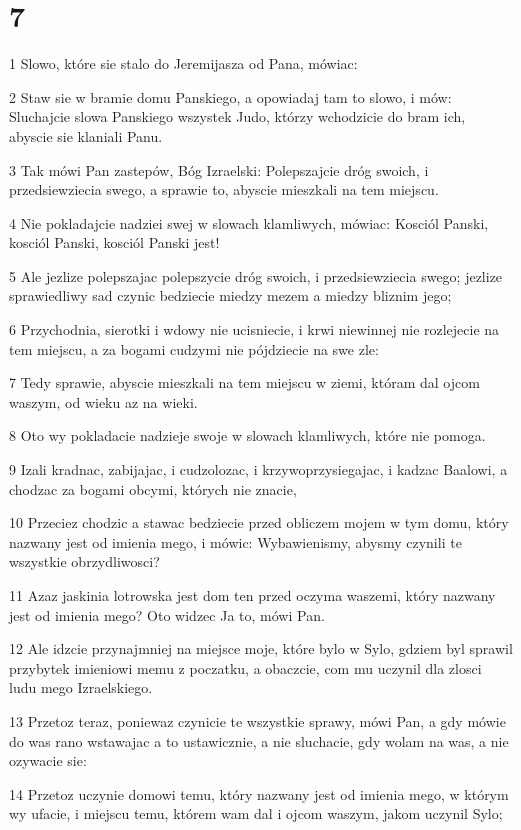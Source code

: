 \chapter{7}

\par 1 Slowo, które sie stalo do Jeremijasza od Pana, mówiac:
\par 2 Staw sie w bramie domu Panskiego, a opowiadaj tam to slowo, i mów: Sluchajcie slowa Panskiego wszystek Judo, którzy wchodzicie do bram ich, abyscie sie klaniali Panu.
\par 3 Tak mówi Pan zastepów, Bóg Izraelski: Polepszajcie dróg swoich, i przedsiewziecia swego, a sprawie to, abyscie mieszkali na tem miejscu.
\par 4 Nie pokladajcie nadziei swej w slowach klamliwych, mówiac: Kosciól Panski, kosciól Panski, kosciól Panski jest!
\par 5 Ale jezlize polepszajac polepszycie dróg swoich, i przedsiewziecia swego; jezlize sprawiedliwy sad czynic bedziecie miedzy mezem a miedzy bliznim jego;
\par 6 Przychodnia, sierotki i wdowy nie ucisniecie, i krwi niewinnej nie rozlejecie na tem miejscu, a za bogami cudzymi nie pójdziecie na swe zle:
\par 7 Tedy sprawie, abyscie mieszkali na tem miejscu w ziemi, któram dal ojcom waszym, od wieku az na wieki.
\par 8 Oto wy pokladacie nadzieje swoje w slowach klamliwych, które nie pomoga.
\par 9 Izali kradnac, zabijajac, i cudzolozac, i krzywoprzysiegajac, i kadzac Baalowi, a chodzac za bogami obcymi, których nie znacie,
\par 10 Przeciez chodzic a stawac bedziecie przed obliczem mojem w tym domu, który nazwany jest od imienia mego, i mówic: Wybawienismy, abysmy czynili te wszystkie obrzydliwosci?
\par 11 Azaz jaskinia lotrowska jest dom ten przed oczyma waszemi, który nazwany jest od imienia mego? Oto widzec Ja to, mówi Pan.
\par 12 Ale idzcie przynajmniej na miejsce moje, które bylo w Sylo, gdziem byl sprawil przybytek imieniowi memu z poczatku, a obaczcie, com mu uczynil dla zlosci ludu mego Izraelskiego.
\par 13 Przetoz teraz, poniewaz czynicie te wszystkie sprawy, mówi Pan, a gdy mówie do was rano wstawajac a to ustawicznie, a nie sluchacie, gdy wolam na was, a nie ozywacie sie:
\par 14 Przetoz uczynie domowi temu, który nazwany jest od imienia mego, w którym wy ufacie, i miejscu temu, którem wam dal i ojcom waszym, jakom uczynil Sylo;
